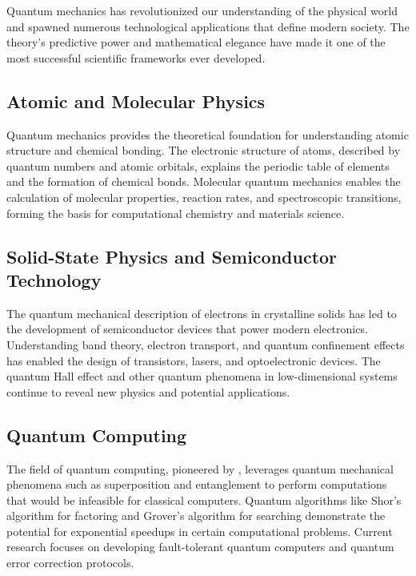 \documentclass[11pt,a4paper]{article}
\begin{document}
Quantum mechanics has revolutionized our understanding of the physical world and spawned numerous technological applications that define modern society. The theory's predictive power and mathematical elegance have made it one of the most successful scientific frameworks ever developed.

\subsection{Atomic and Molecular Physics}

Quantum mechanics provides the theoretical foundation for understanding atomic structure and chemical bonding. The electronic structure of atoms, described by quantum numbers and atomic orbitals, explains the periodic table of elements and the formation of chemical bonds. Molecular quantum mechanics enables the calculation of molecular properties, reaction rates, and spectroscopic transitions, forming the basis for computational chemistry and materials science.

\subsection{Solid-State Physics and Semiconductor Technology}

The quantum mechanical description of electrons in crystalline solids has led to the development of semiconductor devices that power modern electronics. Understanding band theory, electron transport, and quantum confinement effects has enabled the design of transistors, lasers, and optoelectronic devices. The quantum Hall effect and other quantum phenomena in low-dimensional systems continue to reveal new physics and potential applications.

\subsection{Quantum Computing}

The field of quantum computing, pioneered by \cite{feynman1982}, leverages quantum mechanical phenomena such as superposition and entanglement to perform computations that would be infeasible for classical computers. Quantum algorithms like Shor's algorithm for factoring and Grover's algorithm for searching demonstrate the potential for exponential speedups in certain computational problems. Current research focuses on developing fault-tolerant quantum computers and quantum error correction protocols.
\end{document}
